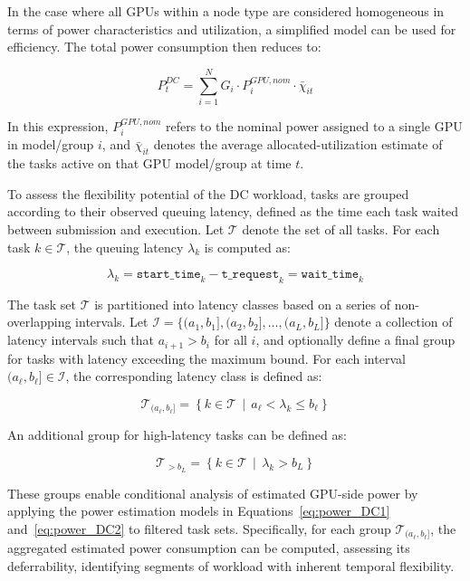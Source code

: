 \documentclass[preprint,12pt]{elsarticle}
\begin{document}
In the case where all GPUs within a node type are considered homogeneous in terms of power characteristics and utilization, a simplified model can be used for efficiency. The total power consumption then reduces to:

\begin{equation} \label{eq:power_DC2}
P^{DC}_t = \sum_{i=1}^{N} G_i \cdot P^{GPU, nom}_i \cdot \bar{\chi}_{it}
\end{equation}

In this expression, $P^{GPU, nom}_i$ refers to the nominal power assigned to a single GPU in model/group $i$, and $\bar{\chi}_{it}$ denotes the average allocated-utilization estimate of the tasks active on that GPU model/group at time $t$.

To assess the flexibility potential of the DC workload, tasks are grouped according to their observed queuing latency, defined as the time each task waited between submission and execution. Let $\mathcal{T}$ denote the set of all tasks. For each task $k \in \mathcal{T}$, the queuing latency $\lambda_k$ is computed as:

\begin{equation}
\lambda_k = \texttt{start\_time}_k - \texttt{t\_request}_k = \texttt{wait\_time}_k
\end{equation}

The task set $\mathcal{T}$ is partitioned into latency classes based on a series of non-overlapping intervals. Let $\mathcal{I} = \{ (a_1, b_1], (a_2, b_2], \dots, (a_L, b_L] \}$ denote a collection of latency intervals such that $a_{i+1} > b_i$ for all $i$, and optionally define a final group for tasks with latency exceeding the maximum bound. For each interval $(a_\ell, b_\ell] \in \mathcal{I}$, the corresponding latency class is defined as:

\begin{equation}
\mathcal{T}_{(a_\ell, b_\ell]} = \left\{ k \in \mathcal{T} \,\middle|\, a_\ell < \lambda_k \leq b_\ell \right\}
\end{equation}

An additional group for high-latency tasks can be defined as:

\begin{equation}
\mathcal{T}_{>b_L} = \left\{ k \in \mathcal{T} \,\middle|\, \lambda_k > b_L \right\}
\end{equation}

These groups enable conditional analysis of estimated GPU-side power by applying the power estimation models in Equations~\ref{eq:power_DC1} and~\ref{eq:power_DC2} to filtered task sets. Specifically, for each group $\mathcal{T}_{(a_\ell, b_\ell]}$, the aggregated estimated power consumption can be computed, assessing its deferrability, identifying segments of workload with inherent temporal flexibility.
\end{document}
